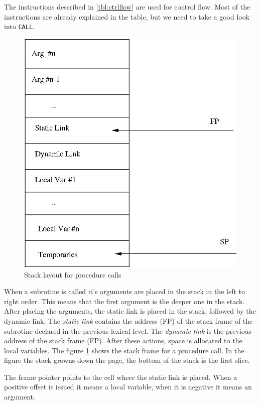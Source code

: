 \documentclass[a4paper, 11pt]{report}
\newcommand{\keyword}[1]{\texttt{#1}}
\begin{document}
The instructions described in \ref{tbl:ctrlflow} are used for control flow. Most of the
instructions are already explained in the table, but we need to take a good look into
\keyword{CALL}.


\begin{figure}
\includegraphics {proc.eps}
\caption{Stack layout for procedure calls}
\label{fig:proc}
\end{figure}

When a subrotine is called it's arguments are placed in the stack in the left to right order.
This means that the first argument is the deeper one in the stack. After placing the arguments,
the static link is placed in the stack, followed by the dynamic link. The \emph{static link}
contains the address (FP) of the stack frame of the subrotine declared in the previous lexical level.
The \emph{dynamic link} is the previous address of the stack frame (FP). After these actions, space
is allocated to the local variables. The figure \ref{fig:proc} shows the stack frame for a procedure
call. In the figure the stack growns down the page, the bottom of the stack is the first slice.

The frame pointer points to the cell where the static link is placed. When a positive offset is
issued it means a local variable, when it is negative it means an argument.
\end{document}
